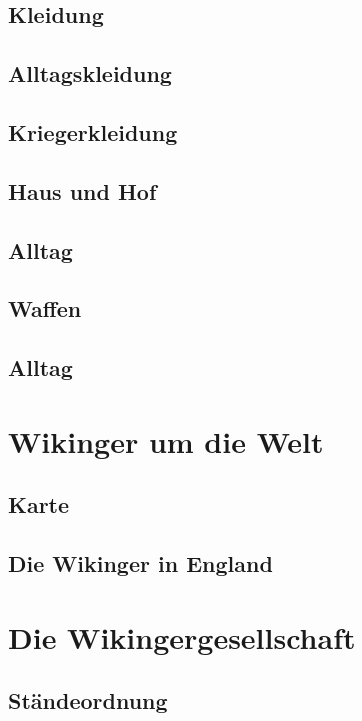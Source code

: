 \documentclass[12pt,a4paper,ngerman]{book}
\newcommand{\fchapter}[1]{\chapter{#1}\thispagestyle{chapterstyle}}
\begin{document}
\section{Kleidung}
\section{Alltagskleidung}

\section{Kriegerkleidung}

\section{Haus und Hof} %

\section{Alltag}

\lipsum[1-2]

\section{Waffen}

\lipsum[1-2]

\section{Alltag} %

\lipsum[6]

\fchapter{Wikinger um die Welt}

\section{Karte} %

\section{Die Wikinger in England}

\lipsum[3]

\fchapter{Die Wikingergesellschaft}

\section{Ständeordnung}
\end{document}
